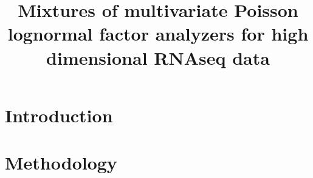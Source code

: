 \documentclass[12pt]{article}
\date{}
\newcommand{\btheta}{\boldsymbol{\theta}}
\newcommand{\bmu}{\boldsymbol{\mu}}
\newcommand{\bSigma}{\boldsymbol{\Sigma}}
\begin{document}
\doublespacing

\title{Mixtures of multivariate Poisson lognormal factor analyzers for high dimensional RNAseq data}

\author{}




\maketitle

\begin{abstract}
\end{abstract}



\section{Introduction}






 

 \section{Methodology}
\end{document}
